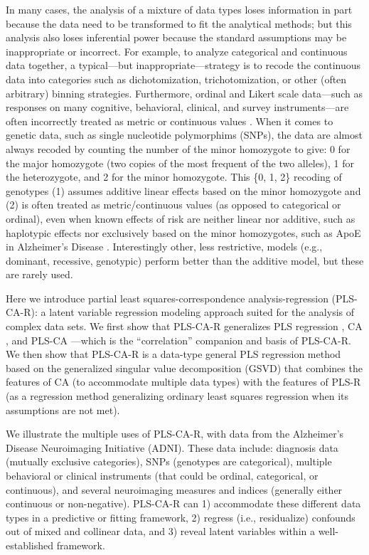 \documentclass[12pt]{article}
\begin{document}
In many cases, the analysis of a mixture of data types loses information
in part because the data need to be transformed to fit the analytical
methods; but this analysis also loses inferential power because the
standard assumptions may be inappropriate or incorrect. For example, to
analyze categorical and continuous data together, a typical---but
inappropriate---strategy is to recode the continuous data into
categories such as dichotomization, trichotomization, or other (often
arbitrary) binning strategies. Furthermore, ordinal and Likert scale
data---such as responses on many cognitive, behavioral, clinical, and
survey instruments---are often incorrectly treated as metric or
continuous values \citep{burkner_ordinal_nodate}. When it comes to
genetic data, such as single nucleotide polymorphims (SNPs), the data
are almost always recoded by counting the number of the minor homozygote
to give: 0 for the major homozygote (two copies of the most frequent of
the two alleles), 1 for the heterozygote, and 2 for the minor
homozygote. This \{0, 1, 2\} recoding of genotypes (1) assumes additive
linear effects based on the minor homozygote and (2) is often treated as
metric/continuous values (as opposed to categorical or ordinal), even
when known effects of risk are neither linear nor additive, such as
haplotypic effects \citep{vormfelde_value_2007} nor exclusively based on
the minor homozygotes, such as ApoE in Alzheimer's Disease
\citep{genin_apoe_2011}. Interestingly other, less restrictive, models
(e.g., dominant, recessive, genotypic) perform better
\citep{lettre2007genetic} than the additive model, but these are rarely
used.

Here we introduce partial least squares-correspondence
analysis-regression (PLS-CA-R): a latent variable regression modeling
approach suited for the analysis of complex data sets. We first show
that PLS-CA-R generalizes PLS regression
\citep{wold_soft_1975, wold_collinearity_1984, tenenhaus_regression_1998, abdi_partial_2010-1},
CA
\citep{greenacre_theory_1984, greenacre_correspondence_2010-1, lebart_multivariate_1984},
and PLS-CA \citep{beaton_partial_2016}---which is the ``correlation''
companion and basis of PLS-CA-R. We then show that PLS-CA-R is a
data-type general PLS regression method based on the generalized
singular value decomposition (GSVD) that combines the features of CA (to
accommodate multiple data types) with the features of PLS-R (as a
regression method generalizing ordinary least squares regression when
its assumptions are not met).

We illustrate the multiple uses of PLS-CA-R, with data from the
Alzheimer's Disease Neuroimaging Initiative (ADNI). These data include:
diagnosis data (mutually exclusive categories), SNPs (genotypes are
categorical), multiple behavioral or clinical instruments (that could be
ordinal, categorical, or continuous), and several neuroimaging measures
and indices (generally either continuous or non-negative). PLS-CA-R can
1) accommodate these different data types in a predictive or fitting
framework, 2) regress (i.e., residualize) confounds out of mixed and
collinear data, and 3) reveal latent variables within a well-established
framework.
\end{document}

